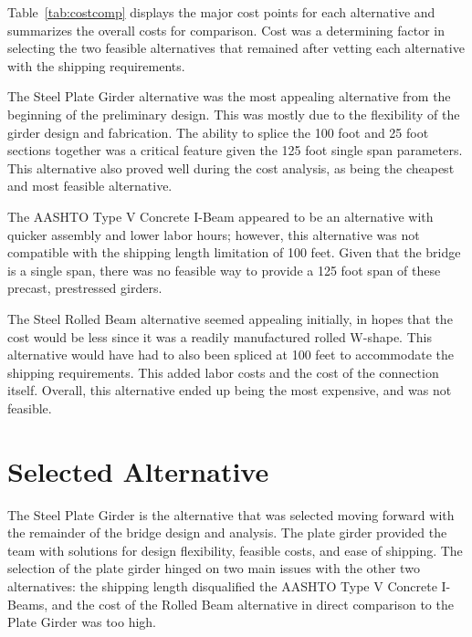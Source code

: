 Table~\ref{tab:costcomp} displays the major cost points for each alternative and summarizes the overall costs for comparison. Cost was a determining factor in selecting the two feasible alternatives that remained after vetting each alternative with the shipping requirements.

The Steel Plate Girder alternative was the most appealing alternative from the beginning of the preliminary design. This was mostly due to the flexibility of the girder design and fabrication. The ability to splice the 100 foot and 25 foot sections together was a critical feature given the 125 foot single span parameters. This alternative also proved well during the cost analysis, as being the cheapest and most feasible alternative.

The AASHTO Type V Concrete I-Beam appeared to be an alternative with quicker assembly and lower labor hours; however, this alternative was not compatible with the shipping length limitation of 100 feet. Given that the bridge is a single span, there was no feasible way to provide a 125 foot span of these precast, prestressed girders.

The Steel Rolled Beam alternative seemed appealing initially, in hopes that the cost would be less since it was a readily manufactured rolled W-shape. This alternative would have had to also been spliced at 100 feet to accommodate the shipping requirements. This added labor costs and the cost of the connection itself. Overall, this alternative ended up being the most expensive, and was not feasible.

\section{Selected Alternative}
The Steel Plate Girder is the alternative that was selected moving forward with the remainder of the bridge design and analysis. The plate girder provided the team with solutions for design flexibility, feasible costs, and ease of shipping. The selection of the plate girder hinged on two main issues with the other two alternatives: the shipping length disqualified the AASHTO Type V Concrete I-Beams, and the cost of the Rolled Beam alternative in direct comparison to the Plate Girder was too high.

